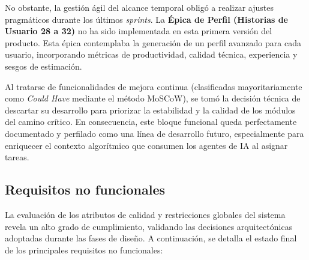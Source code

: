 No obstante, la gestión ágil del alcance temporal obligó a realizar ajustes pragmáticos durante los últimos \emph{sprints}. La \textbf{Épica de Perfil (Historias de Usuario 28 a 32)} no ha sido implementada en esta primera versión del producto. Esta épica contemplaba la generación de un perfil avanzado para cada usuario, incorporando métricas de productividad, calidad técnica, experiencia y sesgos de estimación. 

Al tratarse de funcionalidades de mejora continua (clasificadas mayoritariamente como \emph{Could Have} mediante el método MoSCoW), se tomó la decisión técnica de descartar su desarrollo para priorizar la estabilidad y la calidad de los módulos del camino crítico. En consecuencia, este bloque funcional queda perfectamente documentado y perfilado como una línea de desarrollo futuro, especialmente para enriquecer el contexto algorítmico que consumen los agentes de IA al asignar tareas.

\subsection{Requisitos no funcionales}
La evaluación de los atributos de calidad y restricciones globales del sistema revela un alto grado de cumplimiento, validando las decisiones arquitectónicas adoptadas durante las fases de diseño. A continuación, se detalla el estado final de los principales requisitos no funcionales:

